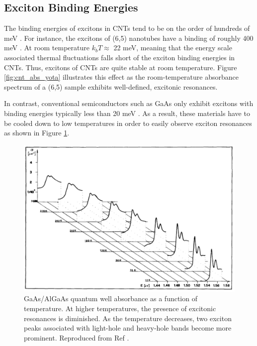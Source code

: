 \subsection{Exciton Binding Energies}

The binding energies of excitons in CNTs tend to be on the order of hundreds of meV \cite{wang2005optical}. For instance, the excitons of (6,5) nanotubes have a binding of roughly 400 meV \cite{wang2005optical}. At room temperature $k_b T \approx$ 22 meV, meaning that the energy scale associated thermal fluctuations falls short of the exciton binding energies in CNTs. Thus, excitons of CNTs are quite stable at room temperature. Figure \ref{fig:cnt_abs_yota} illustrates this effect as the room-temperature absorbance spectrum of a (6,5) sample exhibits well-defined, excitonic resonances. 

In contrast, conventional semiconductors such as GaAs only exhibit excitons with binding energies typically less than 20 meV \cite{liang1970excitons}.  As a result, these materials have to be cooled down to low temperatures in order to easily observe exciton resonances as shown in Figure \ref{fig:gaas_vs_cnt_absorbance}. 

\begin{figure}[h]
	\centering
	\includegraphics[scale=0.55]{images/chapter_optical_props/gaas_absorbance_filipowicz}
	\caption{GaAs/AlGaAs quantum well absorbance as a function of temperature. At higher temperatures, the presence of excitonic resonances is diminished. As the temperature decreases, two exciton peaks associated with light-hole and heavy-hole bands become more prominent. Reproduced from Ref \cite{filipowicz1990temperature}.}
	\label{fig:gaas_vs_cnt_absorbance}
\end{figure}



